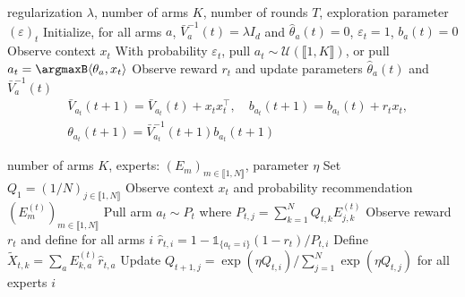 \begin{algorithm}[ht]
  \caption{\epsgreedy}
  \label{alg:egreedy}
\begin{algorithmic}
   regularization  $\lambda$, number of arms $K$, number of rounds $T$, exploration parameter $(\varepsilon)_{t}$
	\STATE Initialize, for all arms $a$, $\bar{V}_{a}^{-1}(t) = \lambda I_{d}$ and $\hat{\theta}_{a}(t) = 0$, $\varepsilon_{t} = 1$, $b_{a}(t) = 0$
  \STATE Observe context $x_{t}$
  \STATE With probability $\varepsilon_{t}$, pull $a_{t} \sim \mathcal{U}\left(\llbracket 1,K\rrbracket\right)$, or pull $a_{t} = \argmaxB \langle \theta_{a}, x_{t}\rangle$ 
  \STATE Observe reward $r_{t}$ and update parameters $\hat{\theta}_{a}(t)$ and $\bar{V}_{a}^{-1}(t)$
    \begin{align*}
      &\bar{V}_{a_{t}}(t+1) = \bar{V}_{a_{t}}(t) + x_{t}x_{t}^{\intercal},\quad b_{a_{t}}(t+1) = b_{a_{t}}(t) + r_{t}x_{t},\\
      &\theta_{a_{t}}(t+1) = \bar{V}_{a_{t}}^{-1}(t+1)b_{a_{t}}(t+1)
  \end{align*}
  \ENDFOR
\end{algorithmic}
\end{algorithm}

\begin{algorithm}[h]
  \caption{\expfour}
  \label{alg:exp4}
\begin{algorithmic}
	 number of arms $K$, experts: $(E_{m})_{m\in\llbracket 1, N\rrbracket}$, parameter $\eta$
  \STATE Set $Q_{1} = (1/N)_{j\in\llbracket 1, N\rrbracket}$
  \STATE Observe context $x_{t}$ and probability recommendation $(E_{m}^{(t)})_{m\in\llbracket 1, N\rrbracket}$
  \STATE Pull arm $a_{t}\sim P_{t}$ where $P_{t,j} = \sum_{k=1}^{N} Q_{t,k}E_{j,k}^{(t)}$ 
  \STATE Observe reward $r_{t}$ and define for all arms $i$ $\hat{r}_{t,i} = 1 - \mathds{1}_{\{ a_{t}=i\}}( 1 - r_{t})/P_{t,i}$
  \STATE Define $\tilde{X}_{t,k} = \sum_{a} E_{k, a}^{(t)}\hat{r}_{t,a}$
  \STATE Update $Q_{t+1, j} = \exp(\eta Q_{t,i})/\sum_{j=1}^{N} \exp(\eta Q_{t,j})$ for all experts $i$
  \ENDFOR
\end{algorithmic}
\end{algorithm}
